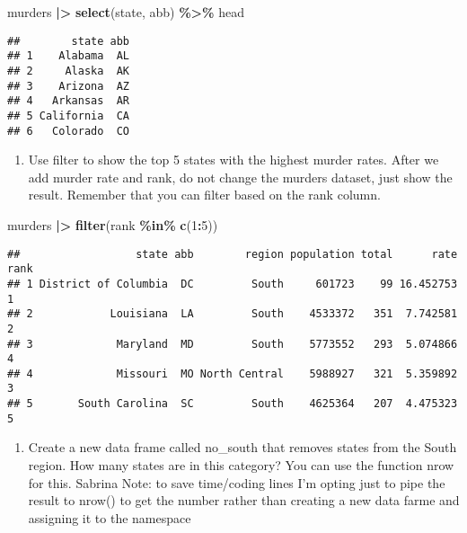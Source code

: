 \documentclass[
]{article}
\newenvironment{Shaded}{\begin{snugshade}}{\end{snugshade}}
\newcommand{\DecValTok}[1]{\textcolor[rgb]{0.00,0.00,0.81}{#1}}
\newcommand{\FunctionTok}[1]{\textcolor[rgb]{0.13,0.29,0.53}{\textbf{#1}}}
\newcommand{\NormalTok}[1]{#1}
\newcommand{\SpecialCharTok}[1]{\textcolor[rgb]{0.81,0.36,0.00}{\textbf{#1}}}
\providecommand{\tightlist}{%
  \setlength{\itemsep}{0pt}\setlength{\parskip}{0pt}}
\begin{document}
\begin{Shaded}
\begin{Highlighting}[]
\NormalTok{murders }\SpecialCharTok{|\textgreater{}} \FunctionTok{select}\NormalTok{(state, abb) }\SpecialCharTok{\%\textgreater{}\%}\NormalTok{ head}
\end{Highlighting}
\end{Shaded}

\begin{verbatim}
##        state abb
## 1    Alabama  AL
## 2     Alaska  AK
## 3    Arizona  AZ
## 4   Arkansas  AR
## 5 California  CA
## 6   Colorado  CO
\end{verbatim}

\begin{enumerate}
\def\labelenumi{\arabic{enumi}.}
\setcounter{enumi}{3}
\tightlist
\item
  Use filter to show the top 5 states with the highest murder rates.
  After we add murder rate and rank, do not change the murders dataset,
  just show the result. Remember that you can filter based on the rank
  column.
\end{enumerate}

\begin{Shaded}
\begin{Highlighting}[]
\NormalTok{murders }\SpecialCharTok{|\textgreater{}} \FunctionTok{filter}\NormalTok{(rank }\SpecialCharTok{\%in\%} \FunctionTok{c}\NormalTok{(}\DecValTok{1}\SpecialCharTok{:}\DecValTok{5}\NormalTok{))}
\end{Highlighting}
\end{Shaded}

\begin{verbatim}
##                  state abb        region population total      rate rank
## 1 District of Columbia  DC         South     601723    99 16.452753    1
## 2            Louisiana  LA         South    4533372   351  7.742581    2
## 3             Maryland  MD         South    5773552   293  5.074866    4
## 4             Missouri  MO North Central    5988927   321  5.359892    3
## 5       South Carolina  SC         South    4625364   207  4.475323    5
\end{verbatim}

\begin{enumerate}
\def\labelenumi{\arabic{enumi}.}
\setcounter{enumi}{4}
\tightlist
\item
  Create a new data frame called no\_south that removes states from the
  South region. How many states are in this category? You can use the
  function nrow for this. Sabrina Note: to save time/coding lines I'm
  opting just to pipe the result to nrow() to get the number rather than
  creating a new data farme and assigning it to the namespace
\end{enumerate}
\end{document}
